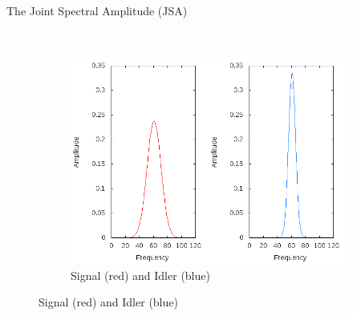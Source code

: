 \documentclass{beamer}
\begin{document}
\begin{frame}{The Joint Spectral Amplitude (JSA)} 
    \begin{figure}
        \centering
        \begin{subfigure}{0.45\textwidth}
        \end{subfigure}
        ~
        \begin{subfigure}{0.45\textwidth}
        \includegraphics[width=1\textwidth]{single_sig_idler1.png}
        \caption{Signal (red) and Idler (blue)}
        \end{subfigure}
    \end{figure}

\end{frame} 
\end{document}
